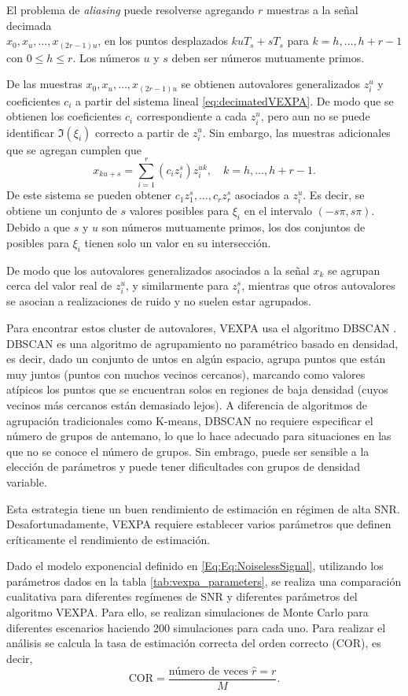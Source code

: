 		El problema de \emph{aliasing} puede resolverse agregando $r$ muestras a la señal decimada \\ $x_0,x_u,\ldots,x_{(2r-1)u}$, en los puntos desplazados $kuT_s + s T_s$ para $k = h,\ldots,h+r-1$ con $0\le h\le r$. Los números $u$ y $s$ deben ser números mutuamente primos.
	
		De las muestras $x_0,x_u,\ldots,x_{(2r-1)u}$ se obtienen autovalores generalizados $z_i^u$ y coeficientes $c_i$ a partir del sistema lineal \eqref{eq:decimatedVEXPA}. De modo que se obtienen los coeficientes $c_i$ correspondiente a cada $z_i^u$, pero aun no se puede identificar $\Im(\xi_i)$ correcto a partir de $z_i^u$. Sin embargo, las muestras adicionales que se agregan cumplen que 
		\[x_{ku + s} = \sum_{i=1}^r (c_iz_i^{s})z_i^{uk}, \quad k = h,\ldots, h+r-1. \]
		De este sistema se pueden obtener $c_1z_1^{s}, \ldots,c_rz_r^{s}$ asociados a $z_i^u$. Es decir, se obtiene un conjunto de $s$ valores posibles para $\xi_i$ en el intervalo  $(-s\pi,s\pi)$. Debido a que $s$ y $u$ son números mutuamente primos, los dos conjuntos de posibles para $\xi_i$ tienen solo un valor en su intersección. 

		De modo que los autovalores generalizados asociados a la señal $x_k$ se agrupan cerca del valor real de $z_i^u$, y similarmente para $z_i^{s}$, mientras que otros autovalores se asocian a realizaciones de ruido y no suelen estar agrupados.  
		
		Para encontrar estos cluster de autovalores, VEXPA usa el algoritmo DBSCAN \cite{ester1996}. DBSCAN es una algoritmo de agrupamiento no paramétrico basado en densidad, es decir, dado un conjunto de untos en algún espacio, agrupa puntos que están muy juntos (puntos con muchos vecinos cercanos), marcando como valores atípicos los puntos que se encuentran solos en regiones de baja densidad (cuyos vecinos más cercanos están demasiado lejos). A diferencia de algoritmos de agrupación tradicionales como K-means, DBSCAN no requiere especificar el número de grupos de antemano, lo que lo hace adecuado para situaciones en las que no se conoce el número de grupos. Sin embrago, puede ser sensible a la elección de parámetros y puede tener dificultades con grupos de densidad variable. 
		
		
		Esta estrategia tiene un buen rendimiento de estimación en régimen de alta SNR. Desafortunadamente, VEXPA  requiere establecer varios parámetros que definen críticamente el rendimiento de estimación. 
		
		Dado el modelo exponencial definido en \eqref{Eq:Eq:NoiselessSignal}, utilizando los parámetros dados en la tabla \ref{tab:vexpa_parameters}, se realiza una comparación cualitativa para diferentes regímenes de SNR y diferentes parámetros del algoritmo VEXPA. Para ello, se realizan simulaciones de Monte Carlo para diferentes escenarios haciendo 200 simulaciones para cada uno. Para realizar el análisis se calcula la tasa de estimación correcta del orden correcto (COR), es decir, 
		\[\mathrm{COR} = \frac{\text{número de veces } \hat{r}=r}{M}.\]
		  
